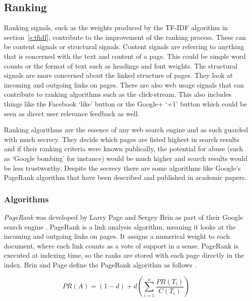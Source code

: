 \subsection{Ranking}
\label{s:ranking}

Ranking signals, such as the weights produced by the \ac{TF}-\ac{IDF} algorithm in section~\ref{s:tfidf}, contribute to the improvement of the ranking process. These can be content signals or structural signals. Content signals are referring to anything that is concerned with the text and content of a page. This could be simple word counts or the format of text such as headings and font weights. The structural signals are more concerned about the linked structure of pages. They look at incoming and outgoing links on pages. There are also web usage signals that can contribute to ranking algorithms such as the click-stream. This also includes things like the Facebook `like' button or the Google+ `+1' button which could be seen as direct user relevance feedback as well.

Ranking algorithms are the essence of any web search engine and as such guarded with much secrecy. They decide which pages are listed highest in search results and if their ranking criteria were known publically, the potential for abuse (such as `Google bombing' \autocite{Nicole2010} for instance) would be much higher and search results would be less trustworthy. Despite the secrecy there are some algorithms like Google's PageRank algorithm that have been described and published in academic papers.


\subsubsection{Algorithms}

\textit{PageRank} was developed by Larry Page and Sergey Brin as part of their Google search engine \autocite*{Brin1998b, Brin1998}. PageRank is a link analysis algorithm, meaning it looks at the incoming and outgoing links on pages. It assigns a numerical weight to each document, where each link counts as a vote of support in a sense. PageRank is executed at indexing time, so the ranks are stored with each page directly in the index. Brin and Page define the PageRank algorithm as follows \autocite*{Brin1998b}\marginpar{$\bm{\Sigma}$~\ref{eq:PR}}.

\begin{equation}
  PR(A) =
  (1 - d) + d (\sum_{i=1}^{n} \frac{PR(T_i)}{C(T_i)})
  \label{eq:PR}
\end{equation}

